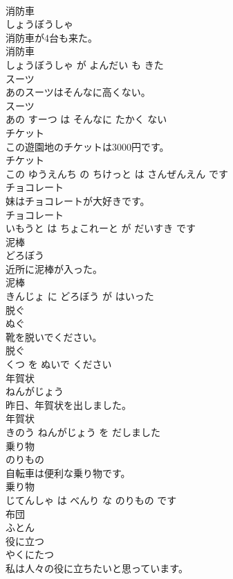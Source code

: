 \documentclass[8pt]{extreport}
\begin{document}
\begin{CJK}{UTF8}{min}
\\	消防車	
\\	しょうぼうしゃ			
\\	消防車が4台も来た。	
\\	消防車 
\\	しょうぼうしゃ が よんだい も きた			
\\	スーツ	
\\	あのスーツはそんなに高くない。	
\\	スーツ 
\\	あの すーつ は そんなに たかく ない			
\\	チケット	
\\	この遊園地のチケットは3000円です。	
\\	チケット 
\\	この ゆうえんち の ちけっと は さんぜんえん です			
\\	チョコレート	
\\	妹はチョコレートが大好きです。	
\\	チョコレート 
\\	いもうと は ちょこれーと が だいすき です			
\\	泥棒	
\\	どろぼう			
\\	近所に泥棒が入った。	
\\	泥棒 
\\	きんじょ に どろぼう が はいった			
\\	脱ぐ	
\\	ぬぐ			
\\	靴を脱いでください。	
\\	脱ぐ 
\\	くつ を ぬいで ください			
\\	年賀状	
\\	ねんがじょう			
\\	昨日、年賀状を出しました。	
\\	年賀状 
\\	きのう ねんがじょう を だしました			
\\	乗り物	
\\	のりもの			
\\	自転車は便利な乗り物です。	
\\	乗り物 
\\	じてんしゃ は べんり な のりもの です			
\\	布団	
\\	ふとん			
\\	役に立つ	
\\	やくにたつ			
\\	私は人々の役に立ちたいと思っています。	

\end{CJK}
\end{document}
